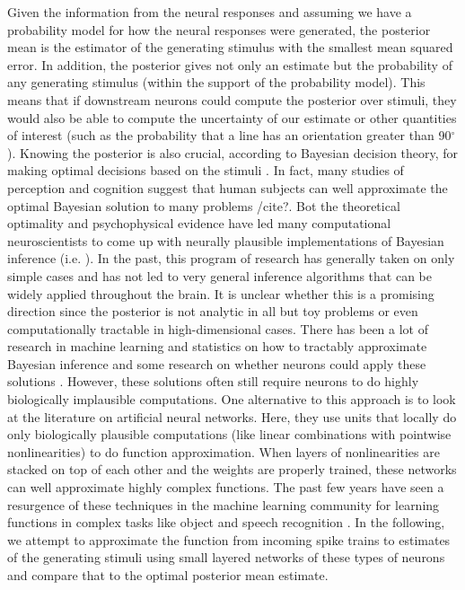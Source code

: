 \documentclass{article} %
\begin{document}
Given the information from the neural responses and assuming we have a probability model for how the neural responses were generated, the posterior mean is the estimator of the generating stimulus with the smallest mean squared error. In addition, the posterior gives not only an estimate but the probability of any generating stimulus (within the support of the probability model). This means that if downstream neurons could compute the posterior over stimuli, they would also be able to compute the uncertainty of our estimate or other quantities of interest (such as the probability that a line has an orientation greater than 90$^{\circ}$). Knowing the posterior is also crucial, according to Bayesian decision theory, for making optimal decisions based on the stimuli \cite{rice06statistics}. In fact, many studies of perception and cognition suggest that human subjects can well approximate the optimal Bayesian solution to many problems /cite{?}. Bot the theoretical optimality and psychophysical evidence have led many computational neuroscientists to come up with neurally plausible implementations of Bayesian inference (i.e. \cite{Ma2006}). In the past, this program of research has generally taken on only simple cases and has not led to very general inference algorithms that can be widely applied throughout the brain. It is unclear whether this is a promising direction since the posterior is not analytic in all but toy problems or even computationally tractable in high-dimensional cases. There has been a lot of research in machine learning and statistics on how to tractably approximate Bayesian inference and some research on whether neurons could apply these solutions \cite{?}. However, these solutions often still require neurons to do highly biologically implausible computations. 
One alternative to this approach is to look at the literature on artificial neural networks. Here, they use units that locally do only biologically plausible computations (like linear combinations with pointwise nonlinearities) to do function approximation. When layers of nonlinearities are stacked on top of each other and the weights are properly trained, these networks can well approximate highly complex functions. The past few years have seen a resurgence of these techniques in the machine learning community for learning functions in complex tasks like object and speech recognition \cite{?}. In the following, we attempt to approximate the function from incoming spike trains to estimates of the generating stimuli using small layered networks of these types of neurons and compare that to the optimal posterior mean estimate.
\end{document}
